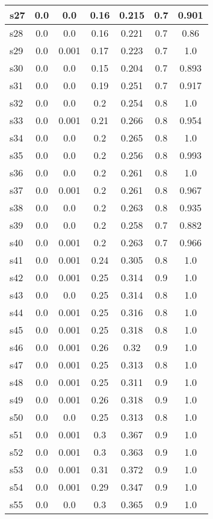 \documentclass{article}
\begin{document}
\begin{tabular}{|l|c|c|c|c|c|c|}
\hline
s27 &0.0 & 0.0 & 0.16 & 0.215 & 0.7 & 0.901\\
\hline
s28 &0.0 & 0.0 & 0.16 & 0.221 & 0.7 & 0.86\\
\hline
s29 &0.0 & 0.001 & 0.17 & 0.223 & 0.7 & 1.0\\
\hline
s30 &0.0 & 0.0 & 0.15 & 0.204 & 0.7 & 0.893\\
\hline
s31 &0.0 & 0.0 & 0.19 & 0.251 & 0.7 & 0.917\\
\hline
s32 &0.0 & 0.0 & 0.2 & 0.254 & 0.8 & 1.0\\
\hline
s33 &0.0 & 0.001 & 0.21 & 0.266 & 0.8 & 0.954\\
\hline
s34 &0.0 & 0.0 & 0.2 & 0.265 & 0.8 & 1.0\\
\hline
s35 &0.0 & 0.0 & 0.2 & 0.256 & 0.8 & 0.993\\
\hline
s36 &0.0 & 0.0 & 0.2 & 0.261 & 0.8 & 1.0\\
\hline
s37 &0.0 & 0.001 & 0.2 & 0.261 & 0.8 & 0.967\\
\hline
s38 &0.0 & 0.0 & 0.2 & 0.263 & 0.8 & 0.935\\
\hline
s39 &0.0 & 0.0 & 0.2 & 0.258 & 0.7 & 0.882\\
\hline
s40 &0.0 & 0.001 & 0.2 & 0.263 & 0.7 & 0.966\\
\hline
s41 &0.0 & 0.001 & 0.24 & 0.305 & 0.8 & 1.0\\
\hline
s42 &0.0 & 0.001 & 0.25 & 0.314 & 0.9 & 1.0\\
\hline
s43 &0.0 & 0.0 & 0.25 & 0.314 & 0.8 & 1.0\\
\hline
s44 &0.0 & 0.001 & 0.25 & 0.316 & 0.8 & 1.0\\
\hline
s45 &0.0 & 0.001 & 0.25 & 0.318 & 0.8 & 1.0\\
\hline
s46 &0.0 & 0.001 & 0.26 & 0.32 & 0.9 & 1.0\\
\hline
s47 &0.0 & 0.001 & 0.25 & 0.313 & 0.8 & 1.0\\
\hline
s48 &0.0 & 0.001 & 0.25 & 0.311 & 0.9 & 1.0\\
\hline
s49 &0.0 & 0.001 & 0.26 & 0.318 & 0.9 & 1.0\\
\hline
s50 &0.0 & 0.0 & 0.25 & 0.313 & 0.8 & 1.0\\
\hline
s51 &0.0 & 0.001 & 0.3 & 0.367 & 0.9 & 1.0\\
\hline
s52 &0.0 & 0.001 & 0.3 & 0.363 & 0.9 & 1.0\\
\hline
s53 &0.0 & 0.001 & 0.31 & 0.372 & 0.9 & 1.0\\
\hline
s54 &0.0 & 0.001 & 0.29 & 0.347 & 0.9 & 1.0\\
\hline
s55 &0.0 & 0.0 & 0.3 & 0.365 & 0.9 & 1.0\\

\end{tabular}
\end{document}
